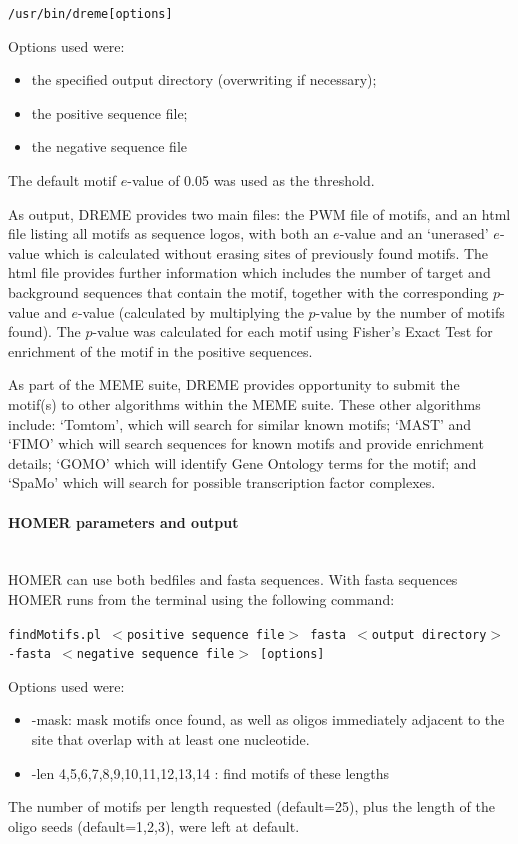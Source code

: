 \documentclass[12pt]{article}
\begin{document}
\texttt{/usr/bin/dreme[options]}

Options used were:
\begin{itemize}
\item the specified output directory (overwriting if necessary);
\item the positive sequence file; 
\item the negative sequence file
\end{itemize}
The default motif $e$-value of 0.05 was used as the threshold.

As output, DREME provides two main files: the PWM file of motifs, and an html file listing all motifs as sequence logos, with both an $e$-value and an `unerased' $e$-value which is calculated without erasing sites of previously found motifs. The html file provides further information which includes the number of target and background sequences that contain the motif, together with the corresponding $p$-value and $e$-value (calculated by multiplying the $p$-value by the number of motifs found). The $p$-value was calculated for each motif using Fisher's Exact Test for enrichment of the motif in the positive sequences.

As part of the MEME suite, DREME provides opportunity to submit the motif(s) to other algorithms within the MEME suite. These other algorithms include: `Tomtom', which will search for similar known motifs; `MAST' and `FIMO' which will search sequences for known motifs and provide enrichment details; `GOMO' which will identify Gene Ontology terms for the motif; and `SpaMo' which will search for possible transcription factor complexes.

\newpage
\paragraph{HOMER parameters and output}\mbox{}\\
HOMER can use both bedfiles and fasta sequences. With fasta sequences HOMER runs from the terminal using the following command:

\texttt{findMotifs.pl $<$positive sequence file$>$ fasta $<$output directory$>$ -fasta $<$negative sequence file$>$ [options]}
 
 
Options used were:
\begin{itemize}
\item -mask: mask motifs once found, as well as oligos immediately adjacent to the site that overlap with at least one nucleotide.
\item -len 4,5,6,7,8,9,10,11,12,13,14 : find motifs of these lengths
\end{itemize}
The number of motifs per length requested (default=25), plus the length of the oligo seeds (default=1,2,3), were left at default.
\end{document}
